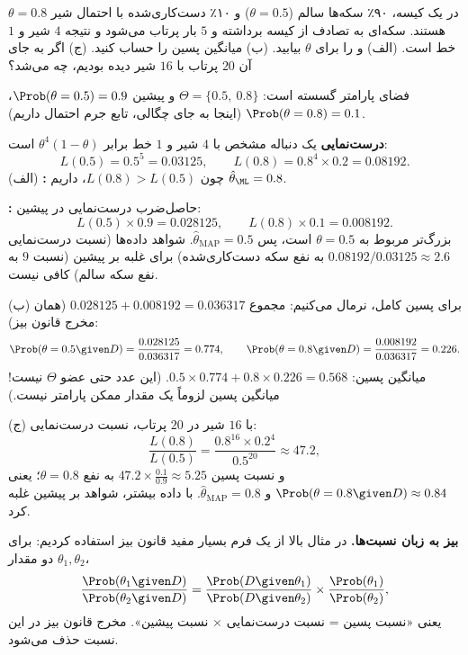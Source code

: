 \begin{example}
در یک کیسه، ۹۰٪ سکه‌ها سالم ($\theta=0.5$) و ۱۰٪ دست‌کاری‌شده با احتمال شیر $\theta=0.8$ هستند. سکه‌ای به تصادف از کیسه برداشته و $5$ بار پرتاب می‌شود و نتیجه $4$ شیر و $1$ خط است. (الف)  و  را برای $\theta$ بیابید. (ب) میانگین پسین را حساب کنید. (ج) اگر به جای آن $20$ پرتاب با $16$ شیر دیده بودیم،  چه می‌شد؟
\begin{solution}
فضای پارامتر گسسته است: $\Theta=\{0.5,\ 0.8\}$ و پیشین $\Prob(\theta=0.5)=0.9$، $\Prob(\theta=0.8)=0.1$ (اینجا به جای چگالی، تابع جرم احتمال داریم).

\textbf{درست‌نمایی} یک دنباله مشخص با $4$ شیر و $1$ خط برابر $\theta^4(1-\theta)$ است:
\[
L(0.5)=0.5^5=0.03125,\qquad L(0.8)=0.8^4\times0.2=0.08192 .
\]
(الف) \textbf{:} چون $L(0.8)>L(0.5)$، داریم $\hat\theta_\ML=0.8$.

\textbf{:} حاصل‌ضرب درست‌نمایی در پیشین:
\[
L(0.5)\times0.9=0.028125,\qquad L(0.8)\times0.1=0.008192 .
\]
بزرگ‌تر مربوط به $\theta=0.5$ است، پس $\hat\theta_{\mathrm{MAP}}=0.5$. شواهد داده‌ها (نسبت درست‌نمایی $0.08192/0.03125\approx2.6$ به نفع سکه دست‌کاری‌شده) برای غلبه بر پیشین (نسبت $9$ به نفع سکه سالم) کافی نیست.

(ب) برای پسین کامل، نرمال می‌کنیم: مجموع $0.028125+0.008192=0.036317$ (همان مخرج قانون بیز):
\[
\Prob(\theta=0.5\given D)=\frac{0.028125}{0.036317}=0.774,\qquad \Prob(\theta=0.8\given D)=\frac{0.008192}{0.036317}=0.226 .
\]
میانگین پسین: $0.5\times0.774+0.8\times0.226=0.568$. (این عدد حتی عضو $\Theta$ نیست! میانگین پسین لزوماً یک مقدار ممکن پارامتر نیست.)

(ج) با $16$ شیر در $20$ پرتاب، نسبت درست‌نمایی:
\[
\frac{L(0.8)}{L(0.5)}=\frac{0.8^{16}\times0.2^4}{0.5^{20}}\approx47.2,
\]
و نسبت پسین $47.2\times\frac{0.1}{0.9}\approx5.25$ به نفع $\theta=0.8$؛ یعنی $\Prob(\theta=0.8\given D)\approx0.84$ و $\hat\theta_{\mathrm{MAP}}=0.8$. با داده بیشتر، شواهد بر پیشین غلبه کرد.
\end{solution}
\end{example}

\begin{note}
\notetitle \textbf{بیز به زبان نسبت‌ها.} در مثال بالا از یک فرم بسیار مفید قانون بیز استفاده کردیم: برای دو مقدار $\theta_1,\theta_2$،
\[
\frac{\Prob(\theta_1\given D)}{\Prob(\theta_2\given D)}=\frac{\Prob(D\given\theta_1)}{\Prob(D\given\theta_2)}\times\frac{\Prob(\theta_1)}{\Prob(\theta_2)},
\]
یعنی «نسبت پسین = نسبت درست‌نمایی × نسبت پیشین». مخرج قانون بیز در این نسبت حذف می‌شود.
\end{note}

